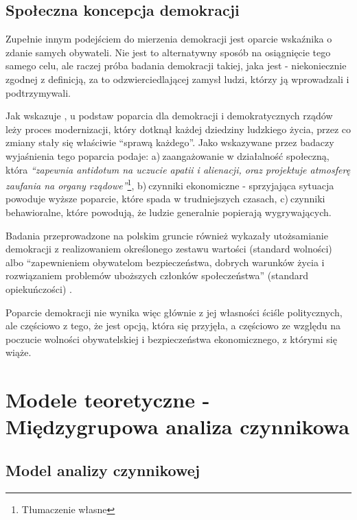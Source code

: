 \documentclass[12pt]{article}
\begin{document}
\hypertarget{spoux142eczna-koncepcja-demokracji}{%
\subsection{Społeczna koncepcja demokracji}\label{spoux142eczna-koncepcja-demokracji}}

Zupełnie innym podejściem do mierzenia demokracji jest oparcie wskaźnika o zdanie samych obywateli. Nie jest to alternatywny sposób na osiągnięcie tego samego celu, ale raczej próba badania demokracji takiej, jaka jest - niekoniecznie zgodnej z definicją, za to odzwierciedlającej zamysł ludzi, którzy ją wprowadzali i podtrzymywali.

Jak wskazuje \citet{Campbell}, u podstaw poparcia dla demokracji i demokratycznych rządów leży proces modernizacji, który dotknął każdej dziedziny ludzkiego życia, przez co zmiany stały się właściwie ``sprawą każdego''. Jako wskazywane przez badaczy wyjaśnienia tego poparcia podaje: a)\(~\)zaangażowanie w działalność społeczną, która \emph{``zapewnia antidotum na uczucie apatii i alienacji, oraz projektuje atmosferę zaufania na organy rządowe''}\footnote{Tłumaczenie własne}, b)\(~\)czynniki ekonomiczne - sprzyjająca sytuacja powoduje wyższe poparcie, które spada w trudniejszych czasach, c)\(~\)czynniki behawioralne, które powodują, że ludzie generalnie popierają wygrywających.

Badania przeprowadzone na polskim gruncie również wykazały utożsamianie demokracji z realizowaniem określonego zestawu wartości (standard wolności) albo ``zapewnieniem obywatelom bezpieczeństwa, dobrych warunków życia i rozwiązaniem problemów uboższych członków społeczeństwa'' (standard opiekuńczości) \citep{JaskoKoss}.

Poparcie demokracji nie wynika więc głównie z jej własności ściśle politycznych, ale częściowo z tego, że jest opcją, która się przyjęła, a częściowo ze względu na poczucie wolności obywatelskiej i bezpieczeństwa ekonomicznego, z którymi się wiąże.

\hypertarget{modele-teoretyczne---miux119dzygrupowa-analiza-czynnikowa}{%
\section{Modele teoretyczne - Międzygrupowa analiza czynnikowa}\label{modele-teoretyczne---miux119dzygrupowa-analiza-czynnikowa}}

\hypertarget{model-analizy-czynnikowej}{%
\subsection{Model analizy czynnikowej}\label{model-analizy-czynnikowej}}
\end{document}
